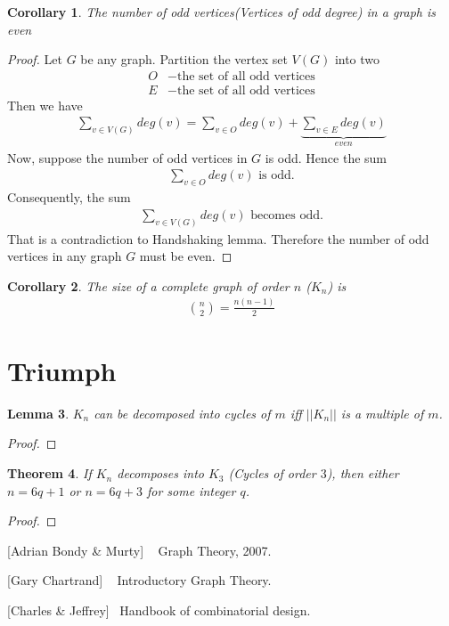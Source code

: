 \documentclass[	DIV=calc,paper=a4,fontsize=11pt]{scrartcl}	 					%
\newtheorem{thm}{Theorem}[section]
\newtheorem{lem}[thm]{Lemma}
\newtheorem{cor}[thm]{Corollary}
\theoremstyle{definition}
\theoremstyle{plain}
\theoremstyle{remark}
\begin{document}
\begin{cor}
The number of odd vertices(Vertices of odd degree) in a graph is even
\end{cor}

\begin{proof}
Let $G$ be any graph. Partition the vertex set $V(G)$ into two
\begin{align*}
O&- \text{the set of all odd vertices}\\
E&-\text{the set of all odd vertices}
\end{align*}
Then we have
\begin{align}
\sum_{v\in V(G)}deg(v)=\sum_{v\in O}deg(v) + \underbrace{\sum_{v\in E}deg(v)}_{even}
\end{align}
Now, suppose the number of odd vertices in $G$ is odd. Hence the sum
\begin{align*}
\sum_{v\in O}deg(v)\text{ is odd.}
\end{align*}
Consequently, the sum
\begin{align*}
\sum_{v\in V(G)}deg(v)\text{ becomes odd.}
\end{align*}
That is a contradiction to Handshaking lemma. Therefore the number of odd vertices in any graph $G$ must be even.
\end{proof}
\begin{cor}
The size of a complete graph of order $n$ ($K_n$) is
\begin{align}
\binom{n}{2}=\frac{n(n-1)}{2}
\end{align}
\end{cor}

\section{Triumph}

\begin{lem}
$K_n$ can be decomposed into cycles of $m$ iff $||K_n||$ is a multiple of $m$.
\end{lem}

\begin{proof}

\end{proof}


\begin{thm}
If $K_n$ decomposes into $K_3$ (Cycles of order $3$), then either $n=6q+1$ or $n=6q+3$ for some integer $q$.
\end{thm}

\begin{proof}

\end{proof}

\begin{thebibliography}{9}

[Adrian Bondy \& Murty] ~
Graph Theory, 2007.


[Gary Chartrand]  ~
Introductory Graph Theory.

[Charles \& Jeffrey]~
Handbook of combinatorial design.
\end{thebibliography}
\end{document}
